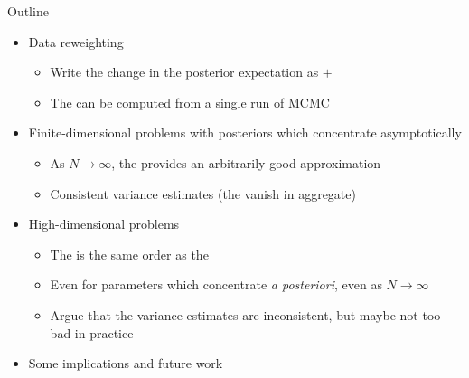 \begin{frame}{Outline}
%
\begin{itemize}
%
\item Data reweighting
%
\begin{itemize}
%
\item Write the change in the posterior expectation
    as  $+$ 
\item The  can be computed from a
single run of MCMC
%
\end{itemize}

\pause
%
\item Finite-dimensional problems with posteriors which concentrate
asymptotically
%
\begin{itemize}
%
\item As $N \rightarrow \infty$, the  provides
an arbitrarily good approximation
\item Consistent variance estimates (the  vanish in aggregate)
%
\end{itemize}
%
\pause
\item High-dimensional problems
\begin{itemize}
%
\item The  is the same order as the 
\item Even for parameters which concentrate \emph{a posteriori}, even as
$N \rightarrow \infty$
\item Argue that the variance estimates are inconsistent, but maybe not too bad in practice

\pause
\end{itemize}
\item Some implications and future work
%
\end{itemize}
%
\end{frame}
